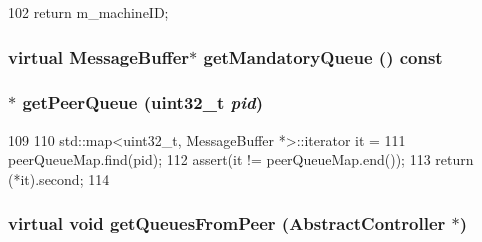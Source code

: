 \begin{DoxyCode}
102 { return m_machineID; }
\end{DoxyCode}
\hypertarget{classAbstractController_a80b4b6fca935f6914fd15ea5715e2170}{
\subsubsection[{getMandatoryQueue}]{\setlength{\rightskip}{0pt plus 5cm}virtual {\bf MessageBuffer}$\ast$ getMandatoryQueue () const}}
\label{classAbstractController_a80b4b6fca935f6914fd15ea5715e2170}
\hypertarget{classAbstractController_a3a55ba724e099baf8906b6ba1a943b52}{
\subsubsection[{getPeerQueue}]{$\ast$ getPeerQueue ({\bf uint32\_\-t} {\em pid})}}
\label{classAbstractController_a3a55ba724e099baf8906b6ba1a943b52}



\begin{DoxyCode}
109     {
110         std::map<uint32_t, MessageBuffer *>::iterator it =
111                                         peerQueueMap.find(pid);
112         assert(it != peerQueueMap.end());
113         return (*it).second;
114     }
\end{DoxyCode}
\hypertarget{classAbstractController_a9a66179697aa43bfa97cee9cf8dbad19}{
\subsubsection[{getQueuesFromPeer}]{\setlength{\rightskip}{0pt plus 5cm}virtual void getQueuesFromPeer ({\bf AbstractController} $\ast$)}}
\label{classAbstractController_a9a66179697aa43bfa97cee9cf8dbad19}



